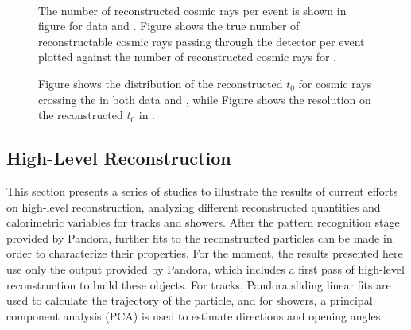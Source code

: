 \begin{figure}[!ht]
\centering
{}
 \\
\caption[Reconstructed cosmic rays per event for data and ]{The number of reconstructed cosmic rays per event is shown in figure \protect{} for data and .  Figure \protect{} shows the true number of reconstructable cosmic rays passing through the detector per event plotted against the number of reconstructed cosmic rays for .}
\label{fig:pandora_protodune_cr_number}
\end{figure}

\begin{figure}[!ht]
\centering
{}
\caption[Distribution of reconstructed $t_{0}$ for cosmic rays]{Figure \protect{} shows the distribution of the reconstructed $t_{0}$ for cosmic rays crossing the  in both data and , while Figure \protect{} shows the resolution on the reconstructed $t_{0}$ in .}
\label{fig:pandora_protodune_cr_t0}
\end{figure}


\subsection{High-Level Reconstruction}
\label{sec:Pandora:High}

This section presents a series of studies to illustrate the results of current efforts on high-level reconstruction, analyzing different reconstructed quantities and calorimetric variables for tracks and showers. After the pattern recognition stage provided by Pandora, further fits to the reconstructed \threed particles can be made in order to characterize their properties. For the moment, the results presented here use only the output provided by Pandora, which includes a first pass of high-level reconstruction to build these objects. For tracks, Pandora sliding linear fits are used to calculate the trajectory of the particle, and for showers, a principal component analysis (PCA) is used to estimate directions and opening angles. 

